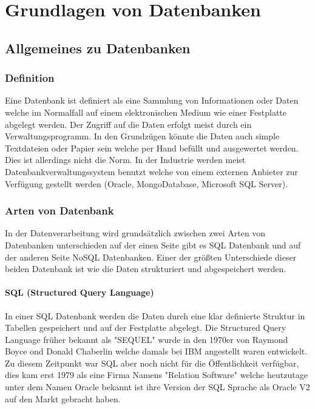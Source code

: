 \chapter{Grundlagen von Datenbanken}
\bauer

	\section{Allgemeines zu Datenbanken}
	
	\subsection{Definition}
	Eine Datenbank ist definiert als eine Sammlung von Informationen oder Daten welche im Normalfall auf einem elektronischen Medium wie einer Festplatte abgelegt werden. Der Zugriff auf die Daten erfolgt meist durch ein Verwaltungsprogramm. In den Grundzügen könnte die Daten auch simple Textdateien oder Papier sein welche per Hand befüllt und ausgewertet werden. Dies ist allerdings nicht die Norm. In der Industrie werden meist Datenbankverwaltungssystem benutzt welche von einem externen Anbieter zur Verfügung gestellt werden (Oracle, MongoDatabase, Microsoft SQL Server).
	
	\subsection{Arten von Datenbank}
	In der Datenverarbeitung wird grundsätzlich zwischen zwei Arten von Datenbanken unterschieden auf der einen Seite gibt es SQL Datenbank und auf der anderen Seite NoSQL Datenbanken. Einer der größten Unterschiede dieser beiden Datenbank ist wie die Daten strukturiert und abgespeichert werden.
	
	\subsubsection{SQL (Structured Query Language)}
	In einer SQL Datenbank werden die Daten durch eine klar definierte Struktur in Tabellen gespeichert und auf der Festplatte abgelegt. Die Structured Query Language früher bekannt als "SEQUEL" wurde in den 1970er von Raymond Boyce ond Donald Chaberlin welche damals bei IBM angestellt waren entwickelt. Zu diesem Zeitpunkt war SQL aber noch nicht für die Öffentlichkeit verfügbar, dies kam erst 1979 als eine Firma Namens "Relation Software" welche heutzutage unter dem Namen Oracle bekannt ist ihre Version der SQL Sprache als Oracle V2 auf den Markt gebracht haben.
	
